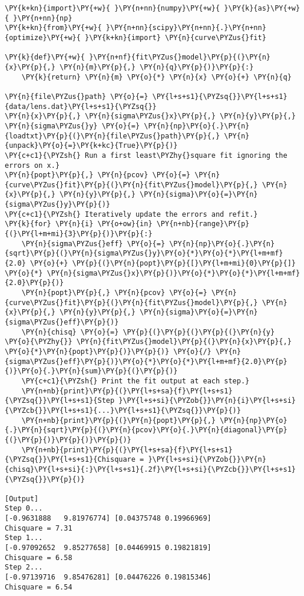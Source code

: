 \begin{Verbatim}[label=\makebox{\href{https://github.com/unipi-physics-labs/statnotes/tree/main/snippy/least_squares_modified.py}{https://github.com/.../least\_squares\_modified.py}},commandchars=\\\{\}]
\PY{k+kn}{import}\PY{+w}{ }\PY{n+nn}{numpy}\PY{+w}{ }\PY{k}{as}\PY{+w}{ }\PY{n+nn}{np}
\PY{k+kn}{from}\PY{+w}{ }\PY{n+nn}{scipy}\PY{n+nn}{.}\PY{n+nn}{optimize}\PY{+w}{ }\PY{k+kn}{import} \PY{n}{curve\PYZus{}fit}

\PY{k}{def}\PY{+w}{ }\PY{n+nf}{fit\PYZus{}model}\PY{p}{(}\PY{n}{x}\PY{p}{,} \PY{n}{m}\PY{p}{,} \PY{n}{q}\PY{p}{)}\PY{p}{:}
    \PY{k}{return} \PY{n}{m} \PY{o}{*} \PY{n}{x} \PY{o}{+} \PY{n}{q}

\PY{n}{file\PYZus{}path} \PY{o}{=} \PY{l+s+s1}{\PYZsq{}}\PY{l+s+s1}{data/lens.dat}\PY{l+s+s1}{\PYZsq{}}
\PY{n}{x}\PY{p}{,} \PY{n}{sigma\PYZus{}x}\PY{p}{,} \PY{n}{y}\PY{p}{,} \PY{n}{sigma\PYZus{}y} \PY{o}{=} \PY{n}{np}\PY{o}{.}\PY{n}{loadtxt}\PY{p}{(}\PY{n}{file\PYZus{}path}\PY{p}{,} \PY{n}{unpack}\PY{o}{=}\PY{k+kc}{True}\PY{p}{)}
\PY{c+c1}{\PYZsh{} Run a first least\PYZhy{}square fit ignoring the errors on x.}
\PY{n}{popt}\PY{p}{,} \PY{n}{pcov} \PY{o}{=} \PY{n}{curve\PYZus{}fit}\PY{p}{(}\PY{n}{fit\PYZus{}model}\PY{p}{,} \PY{n}{x}\PY{p}{,} \PY{n}{y}\PY{p}{,} \PY{n}{sigma}\PY{o}{=}\PY{n}{sigma\PYZus{}y}\PY{p}{)}
\PY{c+c1}{\PYZsh{} Iteratively update the errors and refit.}
\PY{k}{for} \PY{n}{i} \PY{o+ow}{in} \PY{n+nb}{range}\PY{p}{(}\PY{l+m+mi}{3}\PY{p}{)}\PY{p}{:}
    \PY{n}{sigma\PYZus{}eff} \PY{o}{=} \PY{n}{np}\PY{o}{.}\PY{n}{sqrt}\PY{p}{(}\PY{n}{sigma\PYZus{}y}\PY{o}{*}\PY{o}{*}\PY{l+m+mf}{2.0} \PY{o}{+} \PY{p}{(}\PY{n}{popt}\PY{p}{[}\PY{l+m+mi}{0}\PY{p}{]} \PY{o}{*} \PY{n}{sigma\PYZus{}x}\PY{p}{)}\PY{o}{*}\PY{o}{*}\PY{l+m+mf}{2.0}\PY{p}{)}
    \PY{n}{popt}\PY{p}{,} \PY{n}{pcov} \PY{o}{=} \PY{n}{curve\PYZus{}fit}\PY{p}{(}\PY{n}{fit\PYZus{}model}\PY{p}{,} \PY{n}{x}\PY{p}{,} \PY{n}{y}\PY{p}{,} \PY{n}{sigma}\PY{o}{=}\PY{n}{sigma\PYZus{}eff}\PY{p}{)}
    \PY{n}{chisq} \PY{o}{=} \PY{p}{(}\PY{p}{(}\PY{p}{(}\PY{n}{y} \PY{o}{\PYZhy{}} \PY{n}{fit\PYZus{}model}\PY{p}{(}\PY{n}{x}\PY{p}{,} \PY{o}{*}\PY{n}{popt}\PY{p}{)}\PY{p}{)} \PY{o}{/} \PY{n}{sigma\PYZus{}eff}\PY{p}{)}\PY{o}{*}\PY{o}{*}\PY{l+m+mf}{2.0}\PY{p}{)}\PY{o}{.}\PY{n}{sum}\PY{p}{(}\PY{p}{)}
    \PY{c+c1}{\PYZsh{} Print the fit output at each step.}
    \PY{n+nb}{print}\PY{p}{(}\PY{l+s+sa}{f}\PY{l+s+s1}{\PYZsq{}}\PY{l+s+s1}{Step }\PY{l+s+si}{\PYZob{}}\PY{n}{i}\PY{l+s+si}{\PYZcb{}}\PY{l+s+s1}{...}\PY{l+s+s1}{\PYZsq{}}\PY{p}{)}
    \PY{n+nb}{print}\PY{p}{(}\PY{n}{popt}\PY{p}{,} \PY{n}{np}\PY{o}{.}\PY{n}{sqrt}\PY{p}{(}\PY{n}{pcov}\PY{o}{.}\PY{n}{diagonal}\PY{p}{(}\PY{p}{)}\PY{p}{)}\PY{p}{)}
    \PY{n+nb}{print}\PY{p}{(}\PY{l+s+sa}{f}\PY{l+s+s1}{\PYZsq{}}\PY{l+s+s1}{Chisquare = }\PY{l+s+si}{\PYZob{}}\PY{n}{chisq}\PY{l+s+si}{:}\PY{l+s+s1}{.2f}\PY{l+s+si}{\PYZcb{}}\PY{l+s+s1}{\PYZsq{}}\PY{p}{)}

[Output]
Step 0...
[-0.9631888   9.81976774] [0.04375748 0.19966969]
Chisquare = 7.31
Step 1...
[-0.97092652  9.85277658] [0.04469915 0.19821819]
Chisquare = 6.58
Step 2...
[-0.97139716  9.85476281] [0.04476226 0.19815346]
Chisquare = 6.54
\end{Verbatim}
